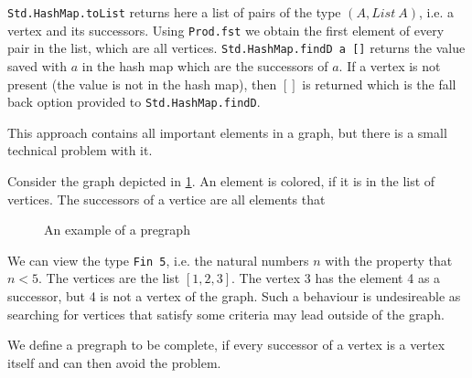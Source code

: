 \lstinline|Std.HashMap.toList| returns here a list of pairs of the type $(A, List\ A)$, i.e. a vertex and its successors. Using \lstinline|Prod.fst| we obtain the first element of every pair in the list, which are all vertices. \lstinline|Std.HashMap.findD a []| returns the value saved with $a$ in the hash map which are the successors of $a$. If a vertex is not present (the value is not in the hash map), then $[]$ is returned which is the fall back option provided to  \lstinline|Std.HashMap.findD|.

This approach contains all important elements in a graph, but there is a small technical problem with it. 

\begin{example}
    
    Consider the graph depicted in \cref{ex:counterexampleGraph}. An element is colored, if it is in the list of vertices. The successors of a vertice are all elements that 

\begin{figure}
    \centering
    \caption{An example of a pregraph}      
    \label{ex:counterexampleGraph}

\end{figure}
    We can view the type \lstinline|Fin 5|, i.e. the natural numbers $n$ with the property that $n<5$. The vertices are the list $[1,2,3]$. The vertex 3 has the element 4 as a successor, but 4 is not a vertex of the graph. Such a behaviour is undesireable as searching for vertices that satisfy some criteria may lead outside of the graph.
\end{example}

We define a pregraph to be complete, if every successor of a vertex is a vertex itself and can then avoid the problem.

